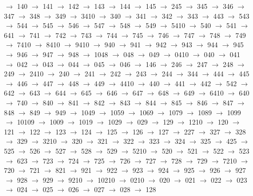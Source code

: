 $\rightarrow$ 140 $\rightarrow$ 141 $\rightarrow$ 142 $\rightarrow$ 143 $\rightarrow$ 144 $\rightarrow$ 145 $\rightarrow$ 245 $\rightarrow$ 345 $\rightarrow$ 346 $\rightarrow$ 347 $\rightarrow$ 348 $\rightarrow$ 349 $\rightarrow$ 3410 $\rightarrow$ 340 $\rightarrow$ 341 $\rightarrow$ 342 $\rightarrow$ 343 $\rightarrow$ 443 $\rightarrow$ 543 $\rightarrow$ 544 $\rightarrow$ 545 $\rightarrow$ 546 $\rightarrow$ 547 $\rightarrow$ 548 $\rightarrow$ 549 $\rightarrow$ 5410 $\rightarrow$ 540 $\rightarrow$ 541 $\rightarrow$ 641 $\rightarrow$ 741 $\rightarrow$ 742 $\rightarrow$ 743 $\rightarrow$ 744 $\rightarrow$ 745 $\rightarrow$ 746 $\rightarrow$ 747 $\rightarrow$ 748 $\rightarrow$ 749 $\rightarrow$ 7410 $\rightarrow$ 8410 $\rightarrow$ 9410 $\rightarrow$ 940 $\rightarrow$ 941 $\rightarrow$ 942 $\rightarrow$ 943 $\rightarrow$ 944 $\rightarrow$ 945 $\rightarrow$ 946 $\rightarrow$ 947 $\rightarrow$ 948 $\rightarrow$ 1048 $\rightarrow$ 048 $\rightarrow$ 049 $\rightarrow$ 0410 $\rightarrow$ 040 $\rightarrow$ 041 $\rightarrow$ 042 $\rightarrow$ 043 $\rightarrow$ 044 $\rightarrow$ 045 $\rightarrow$ 046 $\rightarrow$ 146 $\rightarrow$ 246 $\rightarrow$ 247 $\rightarrow$ 248 $\rightarrow$ 249 $\rightarrow$ 2410 $\rightarrow$ 240 $\rightarrow$ 241 $\rightarrow$ 242 $\rightarrow$ 243 $\rightarrow$ 244 $\rightarrow$ 344 $\rightarrow$ 444 $\rightarrow$ 445 $\rightarrow$ 446 $\rightarrow$ 447 $\rightarrow$ 448 $\rightarrow$ 449 $\rightarrow$ 4410 $\rightarrow$ 440 $\rightarrow$ 441 $\rightarrow$ 442 $\rightarrow$ 542 $\rightarrow$ 642 $\rightarrow$ 643 $\rightarrow$ 644 $\rightarrow$ 645 $\rightarrow$ 646 $\rightarrow$ 647 $\rightarrow$ 648 $\rightarrow$ 649 $\rightarrow$ 6410 $\rightarrow$ 640 $\rightarrow$ 740 $\rightarrow$ 840 $\rightarrow$ 841 $\rightarrow$ 842 $\rightarrow$ 843 $\rightarrow$ 844 $\rightarrow$ 845 $\rightarrow$ 846 $\rightarrow$ 847 $\rightarrow$ 848 $\rightarrow$ 849 $\rightarrow$ 949 $\rightarrow$ 1049 $\rightarrow$ 1059 $\rightarrow$ 1069 $\rightarrow$ 1079 $\rightarrow$ 1089 $\rightarrow$ 1099 $\rightarrow$ 10109 $\rightarrow$ 1009 $\rightarrow$ 1019 $\rightarrow$ 1029 $\rightarrow$ 029 $\rightarrow$ 129 $\rightarrow$ 1210 $\rightarrow$ 120 $\rightarrow$ 121 $\rightarrow$ 122 $\rightarrow$ 123 $\rightarrow$ 124 $\rightarrow$ 125 $\rightarrow$ 126 $\rightarrow$ 127 $\rightarrow$ 227 $\rightarrow$ 327 $\rightarrow$ 328 $\rightarrow$ 329 $\rightarrow$ 3210 $\rightarrow$ 320 $\rightarrow$ 321 $\rightarrow$ 322 $\rightarrow$ 323 $\rightarrow$ 324 $\rightarrow$ 325 $\rightarrow$ 425 $\rightarrow$ 525 $\rightarrow$ 526 $\rightarrow$ 527 $\rightarrow$ 528 $\rightarrow$ 529 $\rightarrow$ 5210 $\rightarrow$ 520 $\rightarrow$ 521 $\rightarrow$ 522 $\rightarrow$ 523 $\rightarrow$ 623 $\rightarrow$ 723 $\rightarrow$ 724 $\rightarrow$ 725 $\rightarrow$ 726 $\rightarrow$ 727 $\rightarrow$ 728 $\rightarrow$ 729 $\rightarrow$ 7210 $\rightarrow$ 720 $\rightarrow$ 721 $\rightarrow$ 821 $\rightarrow$ 921 $\rightarrow$ 922 $\rightarrow$ 923 $\rightarrow$ 924 $\rightarrow$ 925 $\rightarrow$ 926 $\rightarrow$ 927 $\rightarrow$ 928 $\rightarrow$ 929 $\rightarrow$ 9210 $\rightarrow$ 10210 $\rightarrow$ 0210 $\rightarrow$ 020 $\rightarrow$ 021 $\rightarrow$ 022 $\rightarrow$ 023 $\rightarrow$ 024 $\rightarrow$ 025 $\rightarrow$ 026 $\rightarrow$ 027 $\rightarrow$ 028 $\rightarrow$ 128 